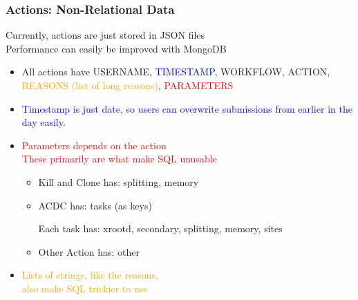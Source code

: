 \documentclass{beamer}
\begin{document}
\begin{frame}
  \frametitle{Actions: Non-Relational Data}
  Currently, actions are just stored in JSON files \\
  Performance can easily be improved  with MongoDB
  \begin{itemize}
  \item All actions have USERNAME, \textcolor{blue}{TIMESTAMP}, WORKFLOW,
    ACTION, \textcolor{orange}{REASONS (list of long reasons)}, \textcolor{red}{PARAMETERS}
  \item \textcolor{blue}{Timestamp is just date,
    so users can overwrite submissions from earlier in the day easily.}
  \item \textcolor{red}{Parameters depends on the action \\
    These primarily are what make SQL unusable}
    \begin{itemize}
    \item Kill and Clone has: splitting, memory
    \item ACDC has: tasks (as keys)
      \begin{itemize}
        Each task has: xrootd, secondary, splitting, memory, sites
      \end{itemize}
    \item Other Action has: other
    \end{itemize}
  \item \textcolor{orange}{
    Lists of strings, like the reasons, \\
    also make SQL trickier to use}
  \end{itemize}
\end{frame}
\end{document}
